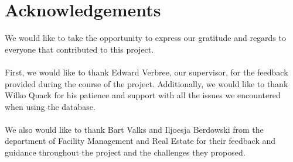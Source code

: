 \chapter{Acknowledgements}
We would like to take the opportunity to express our gratitude and regards to everyone that contributed to this project.\\\\
First, we would like to thank Edward Verbree, our supervisor, for the feedback provided during the course of the project. Additionally, we would like to thank Wilko Quack for his patience and support with all the issues we encountered when using the database.\\\\
We also would like to thank Bart Valks and Iljoesja Berdowski from the department of Facility Management and Real Estate for their feedback and guidance throughout the project and the challenges they proposed. 